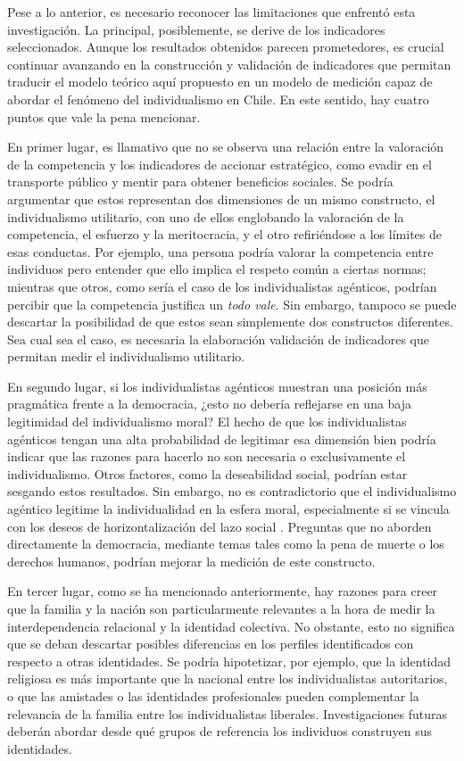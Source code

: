 \documentclass[12pt,twoside]{templates/facsothesis}
\begin{document}
Pese a lo anterior, es necesario reconocer las limitaciones que enfrentó esta investigación. La principal, posiblemente, se derive de los indicadores seleccionados. Aunque los resultados obtenidos parecen prometedores, es crucial continuar avanzando en la construcción y validación de indicadores que permitan traducir el modelo teórico aquí propuesto en un modelo de medición capaz de abordar el fenómeno del individualismo en Chile. En este sentido, hay cuatro puntos que vale la pena mencionar.

En primer lugar, es llamativo que no se observa una relación entre la valoración de la competencia y los indicadores de accionar estratégico, como evadir en el transporte público y mentir para obtener beneficios sociales. Se podría argumentar que estos representan dos dimensiones de un mismo constructo, el individualismo utilitario, con uno de ellos englobando la valoración de la competencia, el esfuerzo y la meritocracia, y el otro refiriéndose a los límites de esas conductas. Por ejemplo, una persona podría valorar la competencia entre individuos pero entender que ello implica el respeto común a ciertas normas; mientras que otros, como sería el caso de los individualistas agénticos, podrían percibir que la competencia justifica un \emph{todo vale}. Sin embargo, tampoco se puede descartar la posibilidad de que estos sean simplemente dos constructos diferentes. Sea cual sea el caso, es necesaria la elaboración validación de indicadores que permitan medir el individualismo utilitario.

En segundo lugar, si los individualistas agénticos muestran una posición más pragmática frente a la democracia, ¿esto no debería reflejarse en una baja legitimidad del individualismo moral? El hecho de que los individualistas agénticos tengan una alta probabilidad de legitimar esa dimensión bien podría indicar que las razones para hacerlo no son necesaria o exclusivamente el individualismo. Otros factores, como la deseabilidad social, podrían estar sesgando estos resultados. Sin embargo, no es contradictorio que el individualismo agéntico legitime la individualidad en la esfera moral, especialmente si se vincula con los deseos de horizontalización del lazo social \citep{araujo2020a}. Preguntas que no aborden directamente la democracia, mediante temas tales como la pena de muerte o los derechos humanos, podrían mejorar la medición de este constructo.

En tercer lugar, como se ha mencionado anteriormente, hay razones para creer que la familia y la nación son particularmente relevantes a la hora de medir la interdependencia relacional y la identidad colectiva. No obstante, esto no significa que se deban descartar posibles diferencias en los perfiles identificados con respecto a otras identidades. Se podría hipotetizar, por ejemplo, que la identidad religiosa es más importante que la nacional entre los individualistas autoritarios, o que las amistades o las identidades profesionales pueden complementar la relevancia de la familia entre los individualistas liberales. Investigaciones futuras deberán abordar desde qué grupos de referencia los individuos construyen sus identidades.
\end{document}
